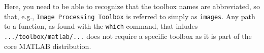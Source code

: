 Here, you need to be able to recognize that the toolbox names are abbreviated, so that, e.g., \lstinline{Image Processing Toolbox} is referred to simply as \lstinline{images}.  Any path to a function, as found with the \lstinline{which} command, that inludes \lstinline{.../toolbox/matlab/...} does not require a specific toolbox as it is part of the core MATLAB distribution.

